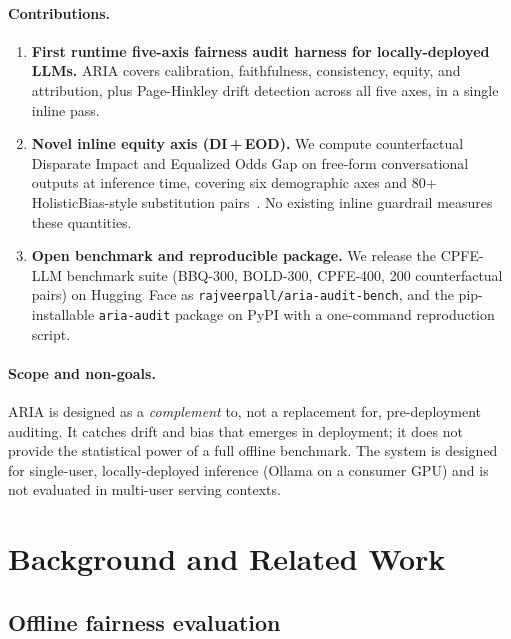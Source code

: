 \documentclass{article}
\begin{document}
\paragraph{Contributions.}
\begin{enumerate}
  \item \textbf{First runtime five-axis fairness audit harness for
        locally-deployed LLMs.}
        ARIA covers calibration, faithfulness, consistency, equity, and
        attribution, plus Page-Hinkley drift detection across all five
        axes, in a single inline pass.
  \item \textbf{Novel inline equity axis (DI\,+\,EOD).}
        We compute counterfactual Disparate Impact and Equalized Odds Gap
        on free-form conversational outputs at inference time, covering
        six demographic axes and 80+ HolisticBias-style substitution
        pairs~\citep{smith2022holisticbias,parrish2022bbq}.
        No existing inline guardrail measures these quantities.
  \item \textbf{Open benchmark and reproducible package.}
        We release the CPFE-LLM benchmark suite (BBQ-300, BOLD-300,
        CPFE-400, 200 counterfactual pairs) on Hugging~Face as
        \texttt{rajveerpall/aria-audit-bench}, and the pip-installable
        \texttt{aria-audit} package on PyPI with a one-command
        reproduction script.
\end{enumerate}

\paragraph{Scope and non-goals.}
ARIA is designed as a \emph{complement} to, not a replacement for,
pre-deployment auditing.
It catches drift and bias that emerges in deployment; it does not provide
the statistical power of a full offline benchmark.
The system is designed for single-user, locally-deployed inference
(Ollama on a consumer GPU) and is not evaluated in multi-user serving
contexts.

\section{Background and Related Work}
\label{sec:related}

\subsection{Offline fairness evaluation}
\end{document}
